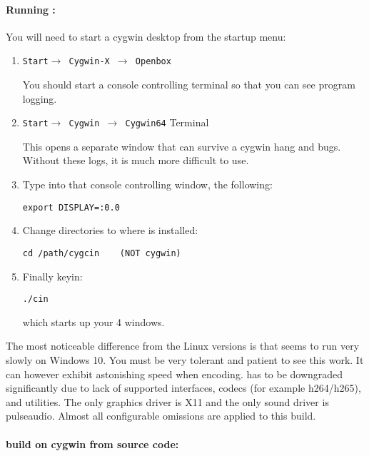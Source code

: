 \paragraph{Running \CGG{}:}
You will need to start a cygwin desktop from the startup menu:
\begin{enumerate}
\item \texttt{Start$\rightarrow$ Cygwin-X $\rightarrow$ Openbox}

  You should start a console controlling terminal so that you can
  see program logging.

\item \texttt{Start$\rightarrow$ Cygwin $\rightarrow$ Cygwin64} Terminal

  This opens a separate window that can survive a cygwin hang and
  bugs. Without these logs, it is much more difficult to use.

\item Type into that console controlling window, the following:
\begin{lstlisting}[style=sh]
export DISPLAY=:0.0
\end{lstlisting}

\item Change directories to where \CGG{} is installed:
\begin{lstlisting}[style=sh]
cd /path/cygcin    (NOT cygwin)
\end{lstlisting}

\item Finally keyin:
\begin{lstlisting}[style=sh]
./cin
\end{lstlisting}
  which starts up your 4 \CGG{} windows.
\end{enumerate}

The most noticeable difference from the Linux versions is that
\CGG{} seems to run very slowly on Windows 10. You must be very
tolerant and patient to see this work.  It can however exhibit
astonishing speed when encoding.  \CGG{} has to be downgraded
significantly due to lack of supported interfaces, codecs (for
example h264/h265), and utilities.  The only graphics driver is
X11 and the only sound driver is pulseaudio.  Almost all
configurable omissions are applied to this build.

\paragraph{\CGG{} build on cygwin from source code:}

